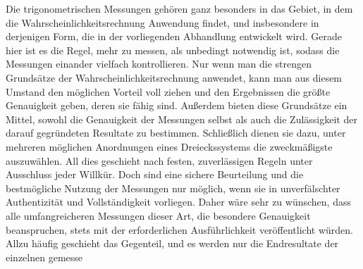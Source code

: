 Die trigonometrischen Messungen gehören ganz besonders in das Gebiet, in dem die Wahrscheinlichkeitsrechnung Anwendung findet, und insbesondere in derjenigen Form, die in der vorliegenden Abhandlung entwickelt wird. Gerade hier ist es die Regel, mehr zu messen, als unbedingt notwendig ist, sodass die Messungen einander vielfach kontrollieren. Nur wenn man die strengen Grundsätze der Wahrscheinlichkeitsrechnung anwendet, kann man aus diesem Umstand den möglichen Vorteil voll ziehen und den Ergebnissen die größte Genauigkeit geben, deren sie fähig sind. Außerdem bieten diese Grundsätze ein Mittel, sowohl die Genauigkeit der Messungen selbst als auch die Zulässigkeit der darauf gegründeten Resultate zu bestimmen. Schließlich dienen sie dazu, unter mehreren möglichen Anordnungen eines Dreieckssystems die zweckmäßigste auszuwählen. All dies geschieht nach festen, zuverlässigen Regeln unter Ausschluss jeder Willkür. Doch sind eine sichere Beurteilung und die bestmögliche Nutzung der Messungen nur möglich, wenn sie in unverfälschter Authentizität und Vollständigkeit vorliegen. Daher wäre sehr zu wünschen, dass alle umfangreicheren Messungen dieser Art, die besondere Genauigkeit beanspruchen, stets mit der erforderlichen Ausführlichkeit veröffentlicht würden. Allzu häufig geschieht das Gegenteil, und es werden nur die Endresultate der einzelnen gemesse%

